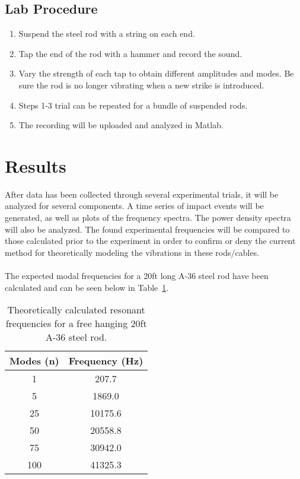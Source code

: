 \documentclass[10pt,letterpaper,titlepage]{article}
\begin{document}
\subsection{Lab Procedure}

\begin{enumerate}
	
	\item Suspend the steel rod with a string on each end.
	\item Tap the end of the rod with a hammer and record the sound. 
	\item Vary the strength of each tap to obtain different amplitudes and modes. Be sure the rod is no longer vibrating when a new strike is introduced. 
	\item Steps 1-3 trial can be repeated for a bundle of suspended rods. 
	\item The recording will be uploaded and analyzed in Matlab. 

\end{enumerate}
\section{Results}

After data has been collected through several experimental trials, it will be analyzed for several components. A time series of impact events will be generated, as well as plots of the frequency spectra. The power density spectra will also be analyzed. The found experimental frequencies will be compared to those calculated prior to the experiment in order to confirm or deny the current method for theoretically modeling the vibrations in these rods/cables. \\ \\

The expected modal frequencies for a 20ft long A-36 steel rod have been calculated and can be seen below in Table~\ref{modes}.

\begin{table}[h]
\centering
\begin{tabular}{c|c}

	Modes (n) & Frequency (Hz) \\ \hline
	1         & 207.7          \\
	5         & 1869.0         \\
	25        & 10175.6        \\
	50        & 20558.8        \\
	75        & 30942.0        \\
	100       & 41325.3       
	
\end{tabular}
\caption{Theoretically calculated resonant frequencies for a free hanging 20ft A-36 steel rod.}
\label{modes}
\end{table}
\end{document}
